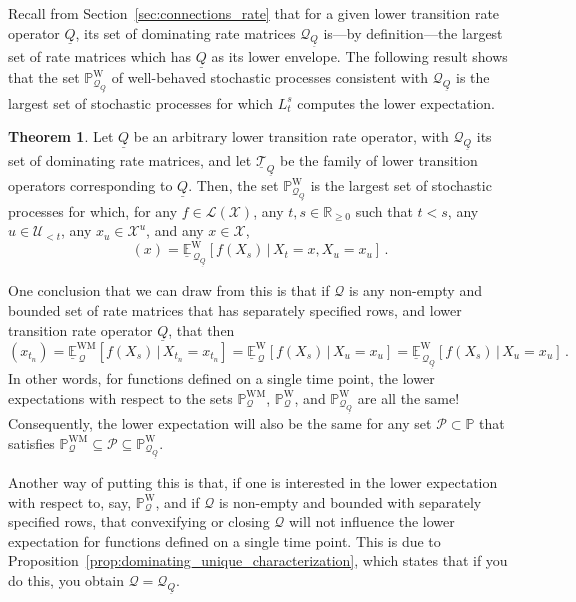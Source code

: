 \documentclass[10pt]{paper}
\theoremstyle{definition}
\newtheorem{theorem}{Theorem}
\newcommand{\reals}{\mathbb{R}}
\newcommand{\realsnonneg}{\reals_{\geq 0}}
\newcommand{\states}{\mathcal{X}}
\newcommand{\processes}{\mathbb{P}}
\newcommand{\wprocesses}{\processes^{\mathrm{W}}}
\newcommand{\wmprocesses}{\processes^{\mathrm{WM}}}
\newcommand{\gambles}{\mathcal{L}}
\newcommand{\gamblesX}{\gambles(\states)}
\newcommand{\rateset}{\mathcal{Q}}
\newcommand{\lrate}{\underline{Q}}
\begin{document}
Recall from Section~\ref{sec:connections_rate} that for a given lower transition rate operator $\lrate$, its set of dominating rate matrices $\rateset_{\lrate}$ is---by definition---the largest set of rate matrices which has $\lrate$ as its lower envelope. The following result shows that the set $\wprocesses_{\rateset_{\lrate}}$ of well-behaved stochastic processes consistent with $\rateset_{\lrate}$ is the largest set of stochastic processes for which $L_t^s$ computes the lower expectation.

\begin{theorem}\label{theo:dominating_rate_processes_max_set}
Let $\lrate$ be an arbitrary lower transition rate operator, with $\rateset_{\lrate}$ its set of dominating rate matrices, and let  $\underline{\mathcal{T}}_{\lrate}$ be the family of lower transition operators corresponding to $\lrate$. Then, the set $\wprocesses_{\rateset_{\lrate}}$ is the largest set of stochastic processes for which, for any $f\in\gamblesX$, any $t,s\in\realsnonneg$ such that $t<s$, any $u\in\mathcal{U}_{<t}$, any $x_u\in\states^u$, and any $x\in\states$,
\begin{equation*}
[L_t^sf](x) = \underline{\mathbb{E}}_{\,\rateset_{\lrate}}^{\mathrm{W}}[f(X_s)\,\vert\,X_t=x,X_u=x_u]\,.
\end{equation*}
\end{theorem}

One conclusion that we can draw from this is that if $\rateset$ is any non-empty and bounded set of rate matrices that has separately specified rows, and lower transition rate operator $\lrate$, that then
\begin{equation*}
[L_{t_n}^sf](x_{t_n}) = \underline{\mathbb{E}}_{\,\rateset}^{\mathrm{WM}}[f(X_s)\,\vert\,X_{t_n}=x_{t_n}] = \underline{\mathbb{E}}_{\,\rateset}^{\mathrm{W}}[f(X_s)\,\vert\,X_u=x_u] = \underline{\mathbb{E}}_{\,\rateset_{\lrate}}^{\mathrm{W}}[f(X_s)\,\vert\,X_u=x_u]\,.
\end{equation*}
In other words, for functions defined on a single time point, the lower expectations with respect to the sets $\wmprocesses_{\rateset}$, $\wprocesses_{\rateset}$, and $\wprocesses_{\rateset_{\lrate}}$ are all the same! Consequently, the lower expectation will also be the same for any set $\mathcal{P}\subset\processes$ that satisfies $\wmprocesses_\rateset \subseteq \mathcal{P} \subseteq \wprocesses_{\rateset_{\lrate}}$.

Another way of putting this is that, if one is interested in the lower expectation with respect to, say, $\wprocesses_{\rateset}$, and if $\rateset$ is non-empty and bounded with separately specified rows, that convexifying or closing $\rateset$ will not influence the lower expectation for functions defined on a single time point. This is due to Proposition~\ref{prop:dominating_unique_characterization}, which states that if you do this, you obtain $\rateset=\rateset_{\lrate}$.
\end{document}
